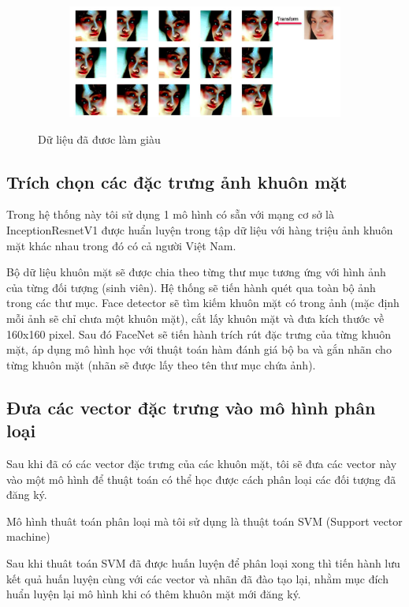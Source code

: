 \begin{figure}
    \begin{subfigure}{1\textwidth}
        \includegraphics[width=1\linewidth]{Chapters/items/chap3_4.jpg}
        \label{fig:chap3_4}
    \end{subfigure}
    \caption{Dữ liệu đã đươc làm giàu}
\end{figure}

\subsection{Trích chọn các đặc trưng ảnh khuôn mặt}
Trong hệ thống này tôi sử dụng 1 mô hình có sẵn với mạng cơ sở là InceptionResnetV1 được
huẩn luyện trong tập dữ liệu với hàng triệu ảnh khuôn mặt khác nhau trong đó có cả người Việt Nam.

Bộ dữ liệu khuôn mặt sẽ được chia theo từng thư mục tương ứng với hình ảnh
của từng đối tượng (sinh viên). Hệ thống sẽ tiến hành quét qua toàn bộ ảnh
trong các thư mục. Face detector sẽ tìm kiếm khuôn mặt có
trong ảnh (mặc định mỗi ảnh sẽ chỉ chưa một khuôn mặt),
cắt lấy khuôn mặt và đưa kích thước về 160x160 pixel.
Sau đó FaceNet sẽ tiến hành trích rút đặc trưng của từng khuôn mặt,
áp dụng mô hình học với thuật toán hàm đánh giá bộ ba và gắn nhãn cho từng
khuôn mặt (nhãn sẽ được lấy theo tên thư mục chứa ảnh).

\subsection{Đưa các vector đặc trưng vào mô hình phân loại}
Sau khi đã có các vector đặc trưng của các khuôn mặt, tôi sẽ đưa các vector này
vào một mô hình để thuật toán có thể học được cách phân loại các đối tượng đã đăng ký.

Mô hình thuât toán phân loại mà tôi sử dụng là thuật toán SVM (Support vector machine)

Sau khi thuât toán SVM đã được huấn luyện để phân loại xong thì tiến hành lưu kết quả huấn luyện cùng
với các vector và nhãn đã đào tạo lại, nhằm mục đích huẩn luyện lại mô hình khi có thêm khuôn mặt mới
đăng ký.

